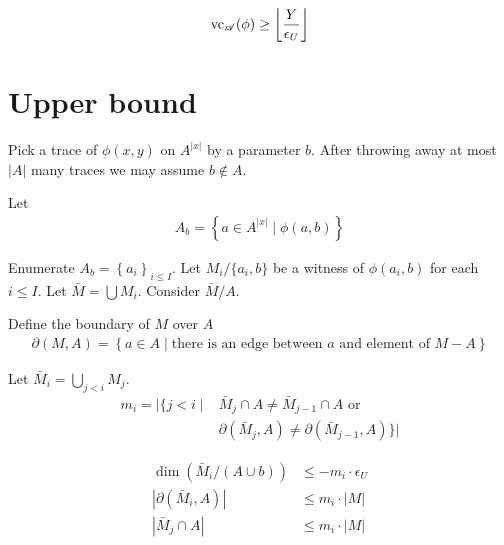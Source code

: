 \documentclass{amsart}
\renewcommand{\AA}{\mathscr A}
\newcommand{\curly}[1]{\left\{#1\right\}}
\providecommand{\floor}[1]{\left \lfloor #1 \right \rfloor }
\begin{document}
\begin{align*}
	\vc_\AA(\phi) \geq \floor{\frac{Y}{\epsilon_U}}
\end{align*}

\section*{Upper bound}


Pick a trace of $\phi(x,y)$ on $A^{|x|}$ by a parameter $b$.
After throwing away at most $|A|$ many traces we may assume $b \notin A$.

Let
\begin{align*}
	A_b = \curly{a \in A^{|x|} \mid \phi(a, b)}
\end{align*}

Enumerate $A_b = \curly{a_i}_{i \leq I}$.
Let $M_i / \{a_i, b\}$ be a witness of $\phi(a_i, b)$ for each $i \leq I$.
Let $\bar M = \bigcup M_i$.
Consider $\bar M / A$.

\begin{Definition}
	Define the boundary of $M$ over $A$
	\begin{align*}
		\partial(M, A) = \curly{a \in A \mid \text{there is an edge between $a$ and element of $M - A$}}
	\end{align*}
\end{Definition}

Let $\bar M_i = \bigcup_{j < i} M_j$.
\begin{align*}
	m_i = |\{j < i \mid 
	&\bar M_j \cap A \neq \bar M_{j-1} \cap A \text{ or }\\
	&\partial(\bar M_j, A) \neq \partial(\bar M_{j-1}, A)\}|
\end{align*}

\begin{Lemma}
	\begin{align*}
		\dim(\bar M_i / (A \cup b)) &\leq -m_i \cdot \epsilon_U \\
		|\partial(\bar M_i, A)| &\leq m_i \cdot |M| \\
		|\bar M_j \cap A| &\leq m_i \cdot |M|
	\end{align*}
\end{Lemma}
\end{document}
